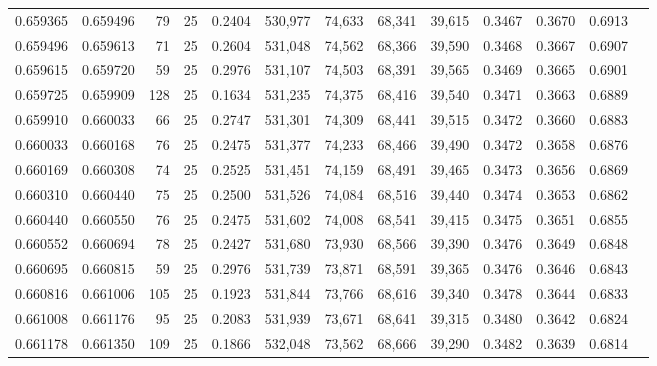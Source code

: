 \begin{tabular}{rrrrrrrrrrrrr}
0.659365 & 0.659496 &    79 &  25 &                                     0.2404 & 530,977 &  74,633 &  68,341 &  39,615 & 0.3467 & 0.3670 & 0.6913 \\
0.659496 & 0.659613 &    71 &  25 &                                     0.2604 & 531,048 &  74,562 &  68,366 &  39,590 & 0.3468 & 0.3667 & 0.6907 \\
0.659615 & 0.659720 &    59 &  25 &                                     0.2976 & 531,107 &  74,503 &  68,391 &  39,565 & 0.3469 & 0.3665 & 0.6901 \\
0.659725 & 0.659909 &   128 &  25 &                                     0.1634 & 531,235 &  74,375 &  68,416 &  39,540 & 0.3471 & 0.3663 & 0.6889 \\
0.659910 & 0.660033 &    66 &  25 &                                     0.2747 & 531,301 &  74,309 &  68,441 &  39,515 & 0.3472 & 0.3660 & 0.6883 \\
0.660033 & 0.660168 &    76 &  25 &                                     0.2475 & 531,377 &  74,233 &  68,466 &  39,490 & 0.3472 & 0.3658 & 0.6876 \\
0.660169 & 0.660308 &    74 &  25 &                                     0.2525 & 531,451 &  74,159 &  68,491 &  39,465 & 0.3473 & 0.3656 & 0.6869 \\
0.660310 & 0.660440 &    75 &  25 &                                     0.2500 & 531,526 &  74,084 &  68,516 &  39,440 & 0.3474 & 0.3653 & 0.6862 \\
0.660440 & 0.660550 &    76 &  25 &                                     0.2475 & 531,602 &  74,008 &  68,541 &  39,415 & 0.3475 & 0.3651 & 0.6855 \\
0.660552 & 0.660694 &    78 &  25 &                                     0.2427 & 531,680 &  73,930 &  68,566 &  39,390 & 0.3476 & 0.3649 & 0.6848 \\
0.660695 & 0.660815 &    59 &  25 &                                     0.2976 & 531,739 &  73,871 &  68,591 &  39,365 & 0.3476 & 0.3646 & 0.6843 \\
0.660816 & 0.661006 &   105 &  25 &                                     0.1923 & 531,844 &  73,766 &  68,616 &  39,340 & 0.3478 & 0.3644 & 0.6833 \\
0.661008 & 0.661176 &    95 &  25 &                                     0.2083 & 531,939 &  73,671 &  68,641 &  39,315 & 0.3480 & 0.3642 & 0.6824 \\
0.661178 & 0.661350 &   109 &  25 &                                     0.1866 & 532,048 &  73,562 &  68,666 &  39,290 & 0.3482 & 0.3639 & 0.6814 \\

\end{tabular}
